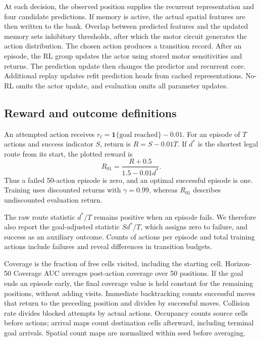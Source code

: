 

At each decision, the observed position supplies the recurrent representation and four candidate predictions. If memory is active, the actual spatial features are then written to the bank. Overlap between predicted features and the updated memory sets inhibitory thresholds, after which the motor circuit generates the action distribution. The chosen action produces a transition record. After an episode, the RL group updates the actor using stored motor sensitivities and returns. The prediction update then changes the predictor and recurrent core. Additional replay updates refit prediction heads from cached representations. No-RL omits the actor update, and evaluation omits all parameter updates.

\subsection{Reward and outcome definitions}
An attempted action receives $r_t=\mathbf1\{\text{goal reached}\}-0.01$. For an episode of $T$ actions and success indicator $S$, return is $R=S-0.01T$. If $d^*$ is the shortest legal route from its start, the plotted reward is
\begin{equation}
 R_{01}=\frac{R+0.5}{1.5-0.01d^*}.
\end{equation}
Thus a failed 50-action episode is zero, and an optimal successful episode is one. Training uses discounted returns with $\gamma=0.99$, whereas $R_{01}$ describes undiscounted evaluation return.

The raw route statistic $d^*/T$ remains positive when an episode fails. We therefore also report the goal-adjusted statistic $S d^*/T$, which assigns zero to failure, and success as an auxiliary outcome. Counts of actions per episode and total training actions include failures and reveal differences in transition budgets.

Coverage is the fraction of free cells visited, including the starting cell. Horizon-50 Coverage AUC averages post-action coverage over 50 positions. If the goal ends an episode early, the final coverage value is held constant for the remaining positions, without adding visits. Immediate backtracking counts successful moves that return to the preceding position and divides by successful moves. Collision rate divides blocked attempts by actual actions. Occupancy counts source cells before actions; arrival maps count destination cells afterward, including terminal goal arrivals. Spatial count maps are normalized within seed before averaging.

